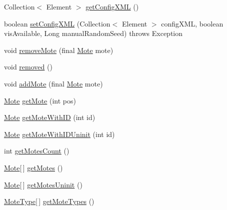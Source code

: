 \begin{DoxyCompactItemize}
\item 
Collection$<$ Element $>$ \hyperlink{classorg_1_1contikios_1_1cooja_1_1Simulation_ac612821b8df3d315a0af2982b167ea7f}{get\-Config\-X\-M\-L} ()
\item 
boolean \hyperlink{classorg_1_1contikios_1_1cooja_1_1Simulation_ae1b710dcc00cb8772117f248a2f64ac8}{set\-Config\-X\-M\-L} (Collection$<$ Element $>$ config\-X\-M\-L, boolean vis\-Available, Long manual\-Random\-Seed)  throws Exception 
\item 
void \hyperlink{classorg_1_1contikios_1_1cooja_1_1Simulation_aece7dddf684bed05eb5ef04d18bcd9df}{remove\-Mote} (final \hyperlink{interfaceorg_1_1contikios_1_1cooja_1_1Mote}{Mote} mote)
\item 
void \hyperlink{classorg_1_1contikios_1_1cooja_1_1Simulation_a1496782314ae0cb2a4318e573cf95364}{removed} ()
\item 
void \hyperlink{classorg_1_1contikios_1_1cooja_1_1Simulation_af5707101a76c8cb2ca3a411d52f5a973}{add\-Mote} (final \hyperlink{interfaceorg_1_1contikios_1_1cooja_1_1Mote}{Mote} mote)
\item 
\hyperlink{interfaceorg_1_1contikios_1_1cooja_1_1Mote}{Mote} \hyperlink{classorg_1_1contikios_1_1cooja_1_1Simulation_aa862d8ad1e7d37cb95a8a63372ba443b}{get\-Mote} (int pos)
\item 
\hyperlink{interfaceorg_1_1contikios_1_1cooja_1_1Mote}{Mote} \hyperlink{classorg_1_1contikios_1_1cooja_1_1Simulation_a4afc60021ede033bd050eb1b80093b71}{get\-Mote\-With\-I\-D} (int id)
\item 
\hyperlink{interfaceorg_1_1contikios_1_1cooja_1_1Mote}{Mote} \hyperlink{classorg_1_1contikios_1_1cooja_1_1Simulation_aedff300078e00e6cb3d1b9b0f06c7461}{get\-Mote\-With\-I\-D\-Uninit} (int id)
\item 
int \hyperlink{classorg_1_1contikios_1_1cooja_1_1Simulation_aa056449b5fb1346d843c9de2f5a3baea}{get\-Motes\-Count} ()
\item 
\hyperlink{interfaceorg_1_1contikios_1_1cooja_1_1Mote}{Mote}\mbox{[}$\,$\mbox{]} \hyperlink{classorg_1_1contikios_1_1cooja_1_1Simulation_a7594b1f093455b52ad9bab91ad39eebb}{get\-Motes} ()
\item 
\hyperlink{interfaceorg_1_1contikios_1_1cooja_1_1Mote}{Mote}\mbox{[}$\,$\mbox{]} \hyperlink{classorg_1_1contikios_1_1cooja_1_1Simulation_af9935db82c2e37bf2171d0a972e65281}{get\-Motes\-Uninit} ()
\item 
\hyperlink{interfaceorg_1_1contikios_1_1cooja_1_1MoteType}{Mote\-Type}\mbox{[}$\,$\mbox{]} \hyperlink{classorg_1_1contikios_1_1cooja_1_1Simulation_a9ce6f6674fb675e655becc5af3e082dd}{get\-Mote\-Types} ()

\end{DoxyCompactItemize}

